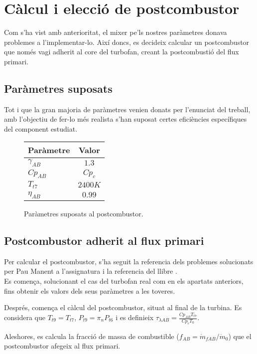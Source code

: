 \section{Càlcul i elecció de postcombustor}
Com s'ha vist amb anterioritat, el mixer pe'ls nostres paràmetres donava problemes a l'implementar-lo. Així doncs, es decideix calcular un postcombustor que només vagi adherit al core del turbofan, creant la postcombustió del flux primari.

\subsection{Paràmetres suposats }
Tot i que la gran majoria de paràmetres venien donats per l'enunciat del treball, amb l'objectiu de fer-lo més realista s'han suposat certes eficiències específiques del component estudiat.

\begin{figure}[H]
	\centering
	\begin{tabular}{lc}
		\toprule[3pt]
		\textbf{Paràmetre}&\textbf{Valor}\\
		\midrule[1pt]
		$\gamma_{AB}$ & $1.3$\\
		$ Cp_{AB}$ & $Cp_c$\\
		$T_{t7}$ & $2400K$\\
		$\eta_{AB}$ & $0.99$\\
		
		\bottomrule[2pt]
	\end{tabular}
	\label{ABparam}
	\caption{Paràmetres suposats al postcombustor.}
\end{figure}


\subsection{Postcombustor adherit al flux primari}
Per calcular el postcombustor, s'ha seguit la referencia dels problemes solucionats per Pau Manent a l'assignatura i la referencia del llibre \cite{mattingly}.\\

\noindent Es comença, solucionant el cas del turbofan real com en els apartats anteriors, fins obtenir els valors dels seus paràmetres a les toveres.

\noindent Després, comença el càlcul del postcombustor, situat al final de la turbina. Es considera que $T_{t9} = T_{t7}$, $P_{t9}=\pi_nP_{t6}$ i es definieix $\tau_{\lambda AB} = \frac{Cp_{AB}T_{t7}}{Cp_cT_0}$.

\noindent Aleshores, es calcula la fracció de massa de combustible ($f_{AB}=\dot{m}_{fAB}/\dot{m}_0$) que el postcombustor afegeix al flux primari.

